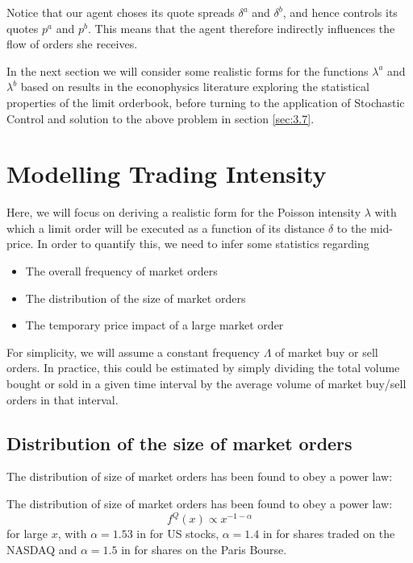 Notice that our agent choses its quote spreads $\delta^a$ and $\delta^b$,
and hence controls its quotes $p^a$ and $p^b$. This means that the 
agent therefore indirectly influences the flow of orders she receives.

In the next section we will consider some realistic forms for the functions
$\lambda^a$ and $\lambda^b$ based on results in the econophysics literature
exploring the statistical properties of the limit orderbook, before 
turning to the application of Stochastic Control and solution to the 
above problem in section \ref{sec:3.7}.

\section{Modelling Trading Intensity}\label{sec:3.6}

Here, we will focus on deriving a realistic form for the Poisson intensity
$\lambda$ with which a limit order will be executed as a function of its
distance $\delta$ to the mid-price. In order to quantify this, we need 
to infer some statistics regarding
\begin{itemize}
    \item The overall frequency of market orders
    \item The distribution of the size of market orders
    \item The temporary price impact of a large market order
\end{itemize}
For simplicity, we will assume a constant frequency $\Lambda$ of market
buy or sell orders. In practice, this could be estimated by simply 
dividing the total volume bought or sold in a given time interval 
by the average volume of market buy/sell orders in that interval. 

\subsection*{Distribution of the size of market orders}

The distribution of size of market orders has been found to obey a 
power law:
\begin{theorem}
    The distribution of size of market orders has been found to obey a 
    power law:
    \begin{equation}\label{eq:3.13}
        f^{Q}(x)\propto x^{-1-\alpha}
    \end{equation}
    for large $x$, with $\alpha=1.53$ in \cite{Gopi2000} for US stocks,
    $\alpha=1.4$ in \cite{Maslov2001} for shares traded on the NASDAQ
    and $\alpha=1.5$ in \cite{Gabaix2006} for shares on the Paris Bourse.
\end{theorem}

